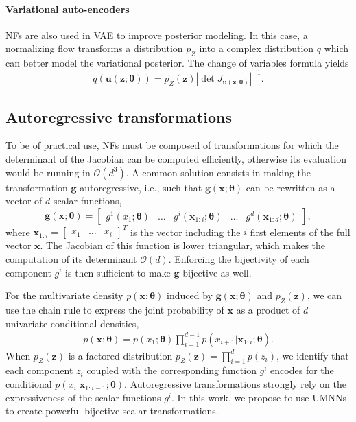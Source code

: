 \paragraph{Variational auto-encoders}
NFs are also used in VAE to improve posterior modeling.
In this case, a normalizing flow transforms a distribution $p_Z$ into a complex distribution $q$ which can better model the variational posterior.
The change of variables formula yields
\begin{equation}
    q(\mathbf{u}(\mathbf{z}; \mathbf{\theta})) = p_Z(\mathbf{z}) \left|\det J_{\mathbf{u}(\mathbf{z};\mathbf{\theta})} \right|^{-1}.\label{eq:NF_VI}
\end{equation}


\subsection{Autoregressive transformations}

To be of practical use, NFs must be composed of transformations for which the determinant of the Jacobian can be computed efficiently, otherwise its evaluation would be running in $\mathcal{O} (d^3)$.
A common solution consists in making the transformation $\mathbf{g}$ autoregressive, i.e., such that $\mathbf{g}(\mathbf{x};\mathbf{\theta})$ can be rewritten as a vector of $d$ scalar functions,
$$ \mathbf{g}(\mathbf{x};\mathbf{\theta}) = \begin{bmatrix}
g^1(x_{1}; \mathbf{\theta}) & \hdots &  g^i(\mathbf{x}_{1 : i}; \mathbf{\theta}) & \hdots & g^d(\mathbf{x}_{1 : d}; \mathbf{\theta})
\end{bmatrix}, $$
where $\mathbf{x}_{1 : i} = \begin{bmatrix} x_1 & \hdots & x_i \end{bmatrix}^T$ is the vector including the $i$ first elements of the full vector $\mathbf{x}$. The Jacobian of this function is lower triangular, which makes the computation of its determinant $\mathcal{O}(d)$.
Enforcing the bijectivity of each component $g^i$ is then sufficient to make $\mathbf{g}$ bijective as well.

For the multivariate density $p(\mathbf{x}; \mathbf{\theta})$ induced by $\mathbf{g}(\mathbf{x};\mathbf{\theta})$ and $p_Z(\mathbf{z})$, we can use the chain rule to express the joint probability of $\mathbf{x}$ as a product of $d$ univariate conditional densities,
\begin{align}
    p(\mathbf{x}; \mathbf{\theta}) = p(x_1; \mathbf{\theta})\prod^{d-1}_{i=1}p(x_{i+1}|\mathbf{x}_{1:i}; \mathbf{\theta}).
\end{align}
When $p_Z(\mathbf{z})$ is a factored distribution $p_Z(\mathbf{z}) = \prod^{d}_{i=1}p(z_i)$, we identify that each component $z_i$ coupled with the corresponding function $g^i$ encodes for the conditional $p(x_{i}|\mathbf{x}_{1:i-1}; \mathbf{\theta})$.
%
Autoregressive transformations strongly rely on the expressiveness of the scalar functions $g^i$.
In this work, we propose to use UMNNs to create powerful bijective scalar transformations.


